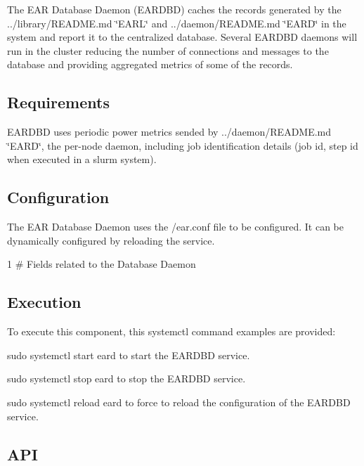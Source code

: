 The E\+AR Database Daemon (E\+A\+R\+D\+BD) caches the records generated by the ../library/\+R\+E\+A\+D\+ME.md \char`\"{}\+E\+A\+R\+L\char`\"{} and ../daemon/\+R\+E\+A\+D\+ME.md \char`\"{}\+E\+A\+R\+D\char`\"{} in the system and report it to the centralized database. Several E\+A\+R\+D\+BD daemons will run in the cluster reducing the number of connections and messages to the database and providing aggregated metrics of some of the records.

\subsection*{Requirements }

E\+A\+R\+D\+BD uses periodic power metrics sended by ../daemon/\+R\+E\+A\+D\+ME.md \char`\"{}\+E\+A\+R\+D\char`\"{}, the per-\/node daemon, including job identification details (job id, step id when executed in a slurm system).

\subsection*{Configuration }

The E\+AR Database Daemon uses the {\ttfamily /ear.conf} file to be configured. It can be dynamically configured by reloading the service.


\begin{DoxyCode}
1 # Fields related to the Database Daemon
\end{DoxyCode}


\subsection*{Execution }

To execute this component, this {\ttfamily systemctl} command examples are provided\+:
\begin{DoxyItemize}
\item {\ttfamily sudo systemctl start eard} to start the E\+A\+R\+D\+BD service.
\item {\ttfamily sudo systemctl stop eard} to stop the E\+A\+R\+D\+BD service.
\item {\ttfamily sudo systemctl reload eard} to force to reload the configuration of the E\+A\+R\+D\+BD service.
\end{DoxyItemize}

\subsection*{A\+PI }

